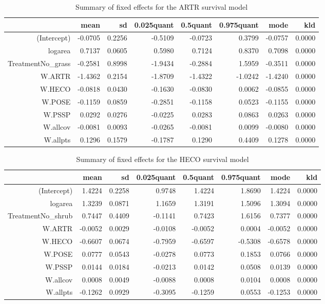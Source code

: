 \begin{table}[ht]
\centering
\caption{Summary of fixed effects for the ARTR survival model} 
\label{ARTRsurvival}
\begin{tabular}{rrrrrrrr}
  \hline
 & mean & sd & 0.025quant & 0.5quant & 0.975quant & mode & kld \\ 
  \hline
(Intercept) & -0.0705 & 0.2256 & -0.5109 & -0.0723 & 0.3799 & -0.0757 & 0.0000 \\ 
  logarea & 0.7137 & 0.0605 & 0.5980 & 0.7124 & 0.8370 & 0.7098 & 0.0000 \\ 
  TreatmentNo\_grass & -0.2581 & 0.8998 & -1.9434 & -0.2884 & 1.5959 & -0.3511 & 0.0000 \\ 
  W.ARTR & -1.4362 & 0.2154 & -1.8709 & -1.4322 & -1.0242 & -1.4240 & 0.0000 \\ 
  W.HECO & -0.0818 & 0.0430 & -0.1630 & -0.0830 & 0.0062 & -0.0855 & 0.0000 \\ 
  W.POSE & -0.1159 & 0.0859 & -0.2851 & -0.1158 & 0.0523 & -0.1155 & 0.0000 \\ 
  W.PSSP & 0.0292 & 0.0276 & -0.0225 & 0.0283 & 0.0863 & 0.0263 & 0.0000 \\ 
  W.allcov & -0.0081 & 0.0093 & -0.0265 & -0.0081 & 0.0099 & -0.0080 & 0.0000 \\ 
  W.allpts & 0.1296 & 0.1579 & -0.1787 & 0.1290 & 0.4409 & 0.1278 & 0.0000 \\ 
   \hline
\end{tabular}
\end{table}

\begin{table}[ht]
\centering
\caption{Summary of fixed effects for the HECO survival model} 
\label{HECOsurvival}
\begin{tabular}{rrrrrrrr}
  \hline
 & mean & sd & 0.025quant & 0.5quant & 0.975quant & mode & kld \\ 
  \hline
(Intercept) & 1.4224 & 0.2258 & 0.9748 & 1.4224 & 1.8690 & 1.4224 & 0.0000 \\ 
  logarea & 1.3239 & 0.0871 & 1.1659 & 1.3191 & 1.5096 & 1.3094 & 0.0000 \\ 
  TreatmentNo\_shrub & 0.7447 & 0.4409 & -0.1141 & 0.7423 & 1.6156 & 0.7377 & 0.0000 \\ 
  W.ARTR & -0.0052 & 0.0029 & -0.0108 & -0.0052 & 0.0004 & -0.0052 & 0.0000 \\ 
  W.HECO & -0.6607 & 0.0674 & -0.7959 & -0.6597 & -0.5308 & -0.6578 & 0.0000 \\ 
  W.POSE & 0.0777 & 0.0543 & -0.0278 & 0.0773 & 0.1853 & 0.0766 & 0.0000 \\ 
  W.PSSP & 0.0144 & 0.0184 & -0.0213 & 0.0142 & 0.0508 & 0.0139 & 0.0000 \\ 
  W.allcov & 0.0008 & 0.0049 & -0.0088 & 0.0008 & 0.0104 & 0.0008 & 0.0000 \\ 
  W.allpts & -0.1262 & 0.0929 & -0.3095 & -0.1259 & 0.0553 & -0.1253 & 0.0000 \\ 
   \hline
\end{tabular}
\end{table}


